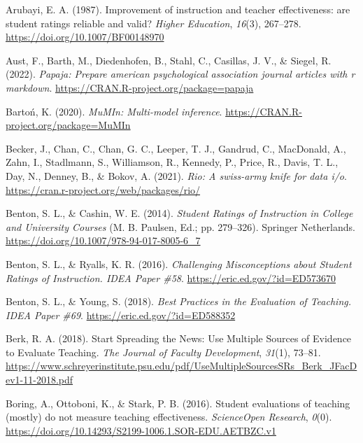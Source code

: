\documentclass[
  man]{apa7}
\newlength{\cslhangindent}
\newlength{\cslentryspacingunit} %
\newenvironment{CSLReferences}[2] %
 {%
  \setlength{\parindent}{0pt}
  \ifodd #1
  \let\oldpar\par
  \def\par{\hangindent=\cslhangindent\oldpar}
  \fi
  \setlength{\parskip}{#2\cslentryspacingunit}
 }%
 {}
\begin{document}
\hypertarget{refs}{}
\begin{CSLReferences}{1}{0}
\leavevmode{}%
Arubayi, E. A. (1987). Improvement of instruction and teacher effectiveness: are student ratings reliable and valid? \emph{Higher Education}, \emph{16}(3), 267--278. \url{https://doi.org/10.1007/BF00148970}

\leavevmode{}%
Aust, F., Barth, M., Diedenhofen, B., Stahl, C., Casillas, J. V., \& Siegel, R. (2022). \emph{Papaja: Prepare american psychological association journal articles with r markdown}. \url{https://CRAN.R-project.org/package=papaja}

\leavevmode{}%
Bartoń, K. (2020). \emph{MuMIn: Multi-model inference}. \url{https://CRAN.R-project.org/package=MuMIn}

\leavevmode{}%
Becker, J., Chan, C., Chan, G. C., Leeper, T. J., Gandrud, C., MacDonald, A., Zahn, I., Stadlmann, S., Williamson, R., Kennedy, P., Price, R., Davis, T. L., Day, N., Denney, B., \& Bokov, A. (2021). \emph{Rio: A swiss-army knife for data i/o}. \url{https://cran.r-project.org/web/packages/rio/}

\leavevmode{}%
Benton, S. L., \& Cashin, W. E. (2014). \emph{Student Ratings of Instruction in College and University Courses} (M. B. Paulsen, Ed.; pp. 279--326). Springer Netherlands. \url{https://doi.org/10.1007/978-94-017-8005-6_7}

\leavevmode{}%
Benton, S. L., \& Ryalls, K. R. (2016). \emph{Challenging Misconceptions about Student Ratings of Instruction. IDEA Paper {\#}58}. \url{https://eric.ed.gov/?id=ED573670}

\leavevmode{}%
Benton, S. L., \& Young, S. (2018). \emph{Best Practices in the Evaluation of Teaching. IDEA Paper {\#}69}. \url{https://eric.ed.gov/?id=ED588352}

\leavevmode{}%
Berk, R. A. (2018). Start Spreading the News: Use Multiple Sources of Evidence to Evaluate Teaching. \emph{The Journal of Faculty Development}, \emph{31}(1), 73--81. \url{https://www.schreyerinstitute.psu.edu/pdf/UseMultipleSourcesSRs_Berk_JFacDev1-11-2018.pdf}

\leavevmode{}%
Boring, A., Ottoboni, K., \& Stark, P. B. (2016). Student evaluations of teaching (mostly) do not measure teaching effectiveness. \emph{ScienceOpen Research}, \emph{0}(0). \url{https://doi.org/10.14293/S2199-1006.1.SOR-EDU.AETBZC.v1}


\end{CSLReferences}
\end{document}
